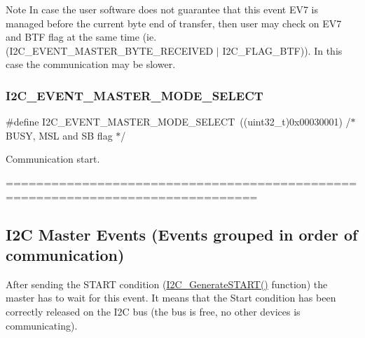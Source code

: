 \begin{DoxyNote}{Note}
In case the user software does not guarantee that this event E\+V7 is managed before the current byte end of transfer, then user may check on E\+V7 and B\+TF flag at the same time (ie. (I2\+C\+\_\+\+E\+V\+E\+N\+T\+\_\+\+M\+A\+S\+T\+E\+R\+\_\+\+B\+Y\+T\+E\+\_\+\+R\+E\+C\+E\+I\+V\+ED $\vert$ I2\+C\+\_\+\+F\+L\+A\+G\+\_\+\+B\+TF)). In this case the communication may be slower. 
\end{DoxyNote}
\mbox{\label{group___i2_c___events_gaeef8c22ac035122b06e31b360ac7aeb3}} 
\subsubsection{\texorpdfstring{I2\+C\+\_\+\+E\+V\+E\+N\+T\+\_\+\+M\+A\+S\+T\+E\+R\+\_\+\+M\+O\+D\+E\+\_\+\+S\+E\+L\+E\+CT}{I2C\_EVENT\_MASTER\_MODE\_SELECT}}
{\footnotesize\ttfamily \#define I2\+C\+\_\+\+E\+V\+E\+N\+T\+\_\+\+M\+A\+S\+T\+E\+R\+\_\+\+M\+O\+D\+E\+\_\+\+S\+E\+L\+E\+CT~((uint32\+\_\+t)0x00030001)  /$\ast$ B\+U\+S\+Y, M\+S\+L and S\+B flag $\ast$/}



Communication start. 

=============================================================================== \subsection*{I2C Master Events (Events grouped in order of communication) }

After sending the S\+T\+A\+RT condition (\mbox{\hyperlink{group___i2_c_ga36c522b471588be9779c878222ccb20f}{I2\+C\+\_\+\+Generate\+S\+T\+A\+R\+T()}} function) the master has to wait for this event. It means that the Start condition has been correctly released on the I2C bus (the bus is free, no other devices is communicating). \mbox{\label{group___i2_c___events_ga2361a6e60b7dc86fb682dd06fbd3edb7}} 

